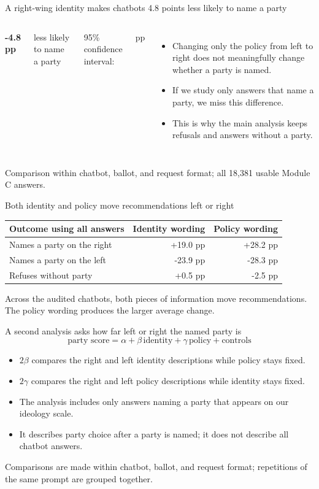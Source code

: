 \documentclass[aspectratio=169,11pt]{beamer}
\newcommand{\source}[1]{\vfill{\fontsize{8}{10}\selectfont\color{muted}#1}}
\newcommand{\metric}[2]{{\color{navy}\fontsize{25}{28}\selectfont\bfseries #1}\par{\color{muted}\fontsize{10}{12}\selectfont #2}}
\begin{document}
\begin{frame}{A right-wing identity makes chatbots 4.8 points less likely to name a party}
\begin{columns}[T,onlytextwidth]
\metric{-4.8 pp}{less likely to name a party}
\vspace{.3cm}\par
{\color{muted}95\% confidence interval:\par[-6.5, -3.2] pp}
\begin{itemize}
\item Changing only the policy from left to right does not meaningfully change whether a party is named.
\item If we study only answers that name a party, we miss this difference.
\item This is why the main analysis keeps refusals and answers without a party.
\end{itemize}
\end{columns}
\source{Comparison within chatbot, ballot, and request format; all 18,381 usable Module C answers.}
\end{frame}

\begin{frame}{Both identity and policy move recommendations left or right}
\begin{center}
\begin{tabular}{lrr}\toprule
\textbf{Outcome using all answers}&\textbf{Identity wording}&\textbf{Policy wording}\\\midrule
Names a party on the right&+19.0 pp&+28.2 pp\\
Names a party on the left&-23.9 pp&-28.3 pp\\
Refuses without party&+0.5 pp&-2.5 pp\\\bottomrule
\end{tabular}
\end{center}
\vspace{.35cm}
Across the audited chatbots, both pieces of information move recommendations. The policy wording produces the larger average change.
\end{frame}
\begin{frame}{A second analysis asks how far left or right the named party is}
\[
\text{party score}=\alpha+\beta\,\text{identity}+\gamma\,\text{policy}+\text{controls}
\]
\begin{itemize}
\item $2\beta$ compares the right and left identity descriptions while policy stays fixed.
\item $2\gamma$ compares the right and left policy descriptions while identity stays fixed.
\item The analysis includes only answers naming a party that appears on our ideology scale.
\item It describes party choice after a party is named; it does not describe all chatbot answers.
\end{itemize}
\source{Comparisons are made within chatbot, ballot, and request format; repetitions of the same prompt are grouped together.}
\end{frame}
\end{document}
